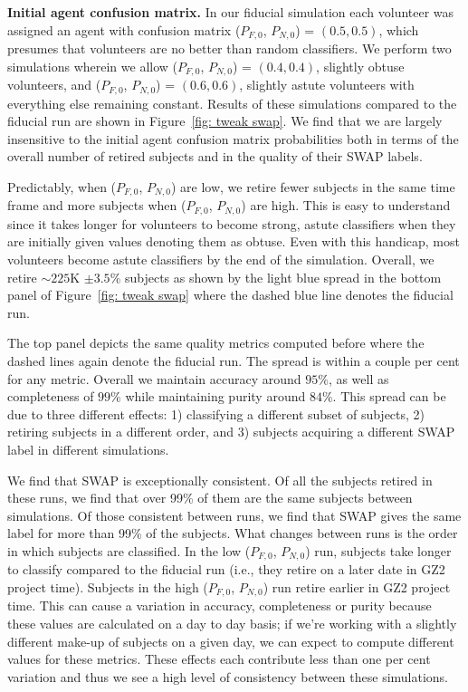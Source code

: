 \documentclass[twocolumn]{aastex6}
\newcommand{\Pf}{$P_{F,0}$}
\newcommand{\Pn}{$P_{N,0}$}
\begin{document}
\textbf{Initial agent confusion matrix.} 
In our fiducial simulation each volunteer was assigned an agent with confusion matrix
 (\Pf, \Pn) = $(0.5, 0.5)$, which presumes that volunteers are no better than 
random classifiers.  We perform two simulations wherein we allow (\Pf, \Pn) = $(0.4, 0.4)$, 
slightly obtuse volunteers, and (\Pf, \Pn) = $(0.6, 0.6)$, slightly astute volunteers 
with everything else remaining constant.  
Results of these simulations compared to the fiducial run are shown in 
Figure~\ref{fig: tweak swap}. We find that we are largely insensitive to the 
initial agent confusion matrix probabilities both in terms of the overall number of retired subjects
and in the quality of their SWAP labels. 

Predictably, when (\Pf, \Pn) are low, we retire fewer subjects in the same time frame and 
more subjects when (\Pf, \Pn) are high. This is easy to understand since it takes 
longer for volunteers to become strong, astute classifiers when they are initially 
given values denoting them as obtuse. Even with this handicap, most volunteers 
become astute classifiers by the end of the simulation. Overall,  we retire 
$\sim225$K  $\pm 3.5\%$ subjects as shown by the light blue spread in the bottom
panel of Figure~\ref{fig: tweak swap} where the dashed blue line
denotes the fiducial run. 

The top panel depicts the same quality metrics computed before where the dashed 
lines again denote the fiducial run.  The spread is within a couple per cent for any
metric. Overall we maintain accuracy around $95\%$, as well as completeness of $99\%$
while maintaining purity around $84\%$. This spread can be due to three different
effects: 1) classifying a different subset of subjects, 2) retiring subjects in a different
order, and 3) subjects acquiring a different SWAP label in different simulations. 

We find that SWAP is exceptionally consistent. Of all the subjects retired in
these runs, we find that over 99\% of them are the same subjects between simulations.
Of those consistent between runs, we find that SWAP gives the same label for 
more than 99\% of the subjects. What changes between runs is the order in 
which subjects are classified. In the low (\Pf, \Pn) run, subjects take longer to classify 
compared to the fiducial run (i.e., they retire on a later date in GZ2 project time). 
Subjects in the high (\Pf, \Pn) run retire earlier in GZ2 project time. This can cause
a variation in accuracy, completeness or purity because these values are 
calculated on a day to day basis; if we're working with a slightly different make-up
of subjects on a given day, we can expect to compute different values for these metrics.
These effects each contribute less than one per cent variation and thus we see a 
high level of consistency between these simulations. 
\end{document}
